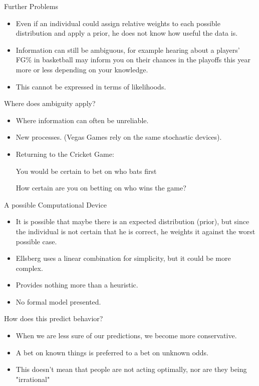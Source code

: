 \documentclass[bigger]{beamer}
\begin{document}
\begin{frame}[label=sec-3-3]{Further Problems}
\begin{itemize}
\item Even if an individual could assign relative weights to each possible
distribution and apply a prior, he does not know how useful the data
is.
\item Information can still be ambiguous, for example hearing about a
players' FG\% in basketball may inform you on their chances in the
playoffs this year more or less depending on your knowledge.
\item This cannot be expressed in terms of likelihoods.
\end{itemize}
\end{frame}

\begin{frame}[label=sec-3-4]{Where does ambiguity apply?}
\begin{itemize}
\item Where information can often be unreliable.
\item New processes. (Vegas Games rely on the same stochastic devices).
\item Returning to the Cricket Game:

You would be certain to bet on who bats first

How certain are you on betting on who wins the game?
\end{itemize}
\end{frame}

\begin{frame}[label=sec-3-5]{A possible Computational Device}
\begin{itemize}
\item It is possible that maybe there is an expected distribution (prior),
but since the individual is not certain that he is correct, he
weights it against the worst possible case.
\item Ellsberg uses a linear combination for simplicity, but it could be
more complex.
\item Provides nothing more than a heuristic.
\item No formal model presented.
\end{itemize}
\end{frame}


\begin{frame}[label=sec-3-6]{How does this predict behavior?}
\begin{itemize}
\item When we are less sure of our predictions, we become more
conservative.
\item A bet on known things is preferred to a bet on unknown odds.
\item This doesn't mean that people are not acting optimally, nor are they
being "irrational"
\end{itemize}
\end{frame}
\end{document}
